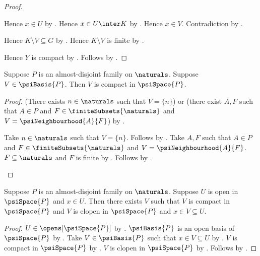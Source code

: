 \begin{proof}
\begin{subproof}
\begin{subproof}
\begin{subproof}
\begin{byCase}
                \end{byCase}
            \end{subproof}
            Hence $x\in U$ by .
            Hence $x\in U\inter K$ by .
            Hence $x\in V$.
            Contradiction by .
        \end{subproof}
        Hence $K\setminus V\subseteq G$ by .
        Hence $K\setminus V$ is finite
            by .
    \end{subproof}
    Hence $Y$ is compact by
        .
    Follows by .
\end{proof}

\begin{theorem}\label{psi_basic_set_compact}
    Suppose $P$ is an almost-disjoint family on $\naturals$.
    Suppose $V\in\psiBasis{P}$.
    Then $V$ is compact in $\psiSpace{P}$.
\end{theorem}
\begin{proof}
    (There exists $n\in\naturals$ such that $V=\{n\}$) or
        (there exist $A,F$ such that $A\in P$ and
            $F\in\finiteSubsets{\naturals}$ and
            $V=\psiNeighbourhood{A}{F}$)
        by .
    \begin{byCase}
            Take $n\in\naturals$ such that $V=\{n\}$.
            Follows by .
            Take $A,F$ such that $A\in P$ and
                $F\in\finiteSubsets{\naturals}$ and
                $V=\psiNeighbourhood{A}{F}$.
            $F\subseteq\naturals$ and $F$ is finite
                by .
            Follows by .
    \end{byCase}
\end{proof}

\begin{theorem}\label{psi_compact_clopen_refinement}
    Suppose $P$ is an almost-disjoint family on $\naturals$.
    Suppose $U$ is open in $\psiSpace{P}$ and $x\in U$.
    Then there exists $V$ such that
        $V$ is compact in $\psiSpace{P}$ and
        $V$ is clopen in $\psiSpace{P}$ and
        $x\in V\subseteq U$.
\end{theorem}
\begin{proof}
    $U\in\opens[\psiSpace{P}]$ by .
    $\psiBasis{P}$ is an open basis of $\psiSpace{P}$
        by .
    Take $V\in\psiBasis{P}$ such that $x\in V\subseteq U$
        by .
    $V$ is compact in $\psiSpace{P}$ by .
    $V$ is clopen in $\psiSpace{P}$ by .
    Follows by \auto.
\end{proof}

